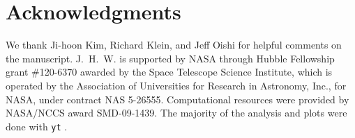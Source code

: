 \documentclass[useAMS,usenatbib]{mn2e}
\begin{document}
\section*{Acknowledgments}

We thank Ji-hoon Kim, Richard Klein, and Jeff Oishi for helpful
comments on the manuscript.  J.~H.~W. is supported by NASA through
Hubble Fellowship grant \#120-6370 awarded by the Space Telescope
Science Institute, which is operated by the Association of
Universities for Research in Astronomy, Inc., for NASA, under contract
NAS 5-26555.  Computational resources were provided by NASA/NCCS award
SMD-09-1439.  The majority of the analysis and plots were done with
\texttt{yt} \citep{yt_full_paper}.



\bsp

\label{lastpage}
\end{document}
